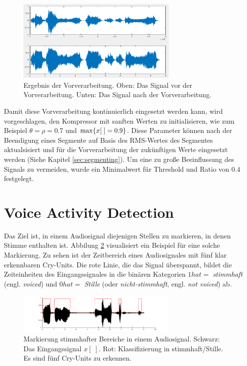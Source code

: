 \begin{figure}[h]
	\centering
	\includegraphics[width=0.7\textwidth]{bilder/compressing01.png}
	\caption{Ergebnis der Vorverarbeitung. Oben: Das Signal vor der Vorverarbeitung. Unten: Das Signal nach der Vorverarbeitung.}
	\label{img:compressing01}
\end{figure}

Damit diese Vorverarbeitung kontinuierlich eingesetzt werden kann, wird vorgeschlagen, den Kompressor mit \grqq sanften Werten\grqq{} zu initialisieren, wie zum Beispiel $\theta = \rho = 0.7$ und $\operatorname*{max}\{x[\;] = 0.9\}$. Diese Parameter können nach der Beendigung eines Segmente auf Basis des RMS-Wertes des Segmentes aktualsisiert und für die Vorverarbeitung der zukünftigen Werte eingesetzt werden (Siehe Kapitel \ref{sec:segmenting}). Um eine zu große Beeinflussung des Signals zu vermeiden, wurde ein Minimalwert für Threshold und Ratio von $0.4$ festgelegt.

\section{Voice Activity Detection}
\label{sec:vad}

Das Ziel ist, in einem Audiosignal diejenigen Stellen zu markieren, in denen Stimme enthalten ist. Abbilung \ref{img:vad01} visualisiert ein Beispiel für eine solche Markierung. Zu sehen ist der Zeitbereich eines Audiosignales mit fünf klar erkennbaren Cry-Units. Die rote Linie, die das Signal überspannt, bildet die Zeiteinheiten des Eingangssignales in die binären Kategorien $1 hat{=} $ \emph{stimmhaft} (engl. \emph{voiced}) und $0 hat{=}  $ \emph{Stille} (oder \emph{nicht-stimmhaft}, engl. \emph{not voiced}) ab.

\begin{figure}[h]
	\centering
	\includegraphics[width=0.7\textwidth]{bilder/vad_introduction01.png}
	\caption{Markierung stimmhafter Bereiche in einem Audiosignal. Schwarz: Das Eingangssignal $x[\;]$. Rot: Klassifizierung in stimmhaft/Stille. Es sind fünf Cry-Units zu erkennen.}
	\label{img:vad01}
\end{figure}

